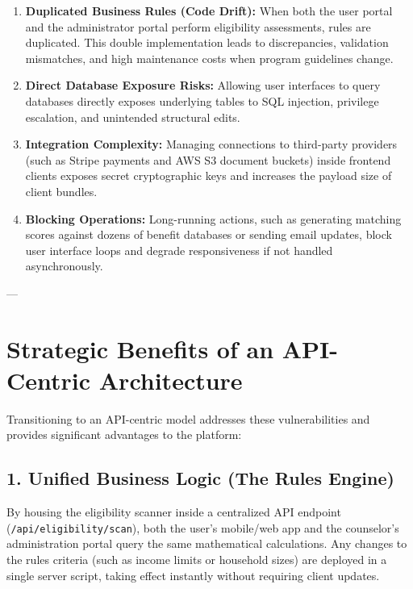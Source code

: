 \documentclass[11pt,a4paper]{article}
\begin{document}
\begin{enumerate}[label=\textbf{\arabic*.}]
    \item \textbf{Duplicated Business Rules (Code Drift):}
    When both the user portal and the administrator portal perform eligibility assessments, rules are duplicated. This double implementation leads to discrepancies, validation mismatches, and high maintenance costs when program guidelines change.
    
    \item \textbf{Direct Database Exposure Risks:}
    Allowing user interfaces to query databases directly exposes underlying tables to SQL injection, privilege escalation, and unintended structural edits.
    
    \item \textbf{Integration Complexity:}
    Managing connections to third-party providers (such as Stripe payments and AWS S3 document buckets) inside frontend clients exposes secret cryptographic keys and increases the payload size of client bundles.
    
    \item \textbf{Blocking Operations:}
    Long-running actions, such as generating matching scores against dozens of benefit databases or sending email updates, block user interface loops and degrade responsiveness if not handled asynchronously.
\end{enumerate}

---

\section{Strategic Benefits of an API-Centric Architecture}
Transitioning to an API-centric model addresses these vulnerabilities and provides significant advantages to the platform:

\subsection{1. Unified Business Logic (The Rules Engine)}
By housing the eligibility scanner inside a centralized API endpoint (\texttt{/api/eligibility/scan}), both the user's mobile/web app and the counselor's administration portal query the same mathematical calculations. Any changes to the rules criteria (such as income limits or household sizes) are deployed in a single server script, taking effect instantly without requiring client updates.
\end{document}
